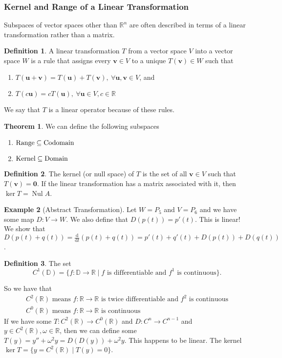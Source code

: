 \documentclass{article}
\numberwithin{equation}{section}
\theoremstyle{definition}
\newtheorem{thm}{Theorem}[subsection]
\newtheorem{defn}{Definition}[subsection]
\newtheorem{ex}[thm]{Example}
\newcommand{\V}{\mathbf{v}}
\newcommand{\U}{\mathbf{u}}
\newcommand{\den}[1][]{\text{d}#1}
\newcommand{\R}{\mathbb{R}}
\DeclareMathOperator{\nul}{Nul}
\let\oldforall\forall
\renewcommand{\forall}{\mathrel{\oldforall}}
\theoremstyle{adefn}
\begin{document}
	\subsubsection{Kernel and Range of a Linear Transformation}
	Subspaces of vector spaces other than $\R^n$ are often described in terms of a linear transformation rather than a matrix. 
	\begin{defn}
		A linear transformation $T$ from a vector space $V$ into a vector space $W$ is a rule that assigns every $\V \in V$ to a unique $T(\V) \in W$ such that
		\begin{enumerate}
			\itemsep0em
			\item $T(\U + \V) = T(\U) + T(\V),\ \forall \U, \V \in V$, and
			\item $T(c\U) = cT(\U),\ \forall \U \in V, c \in \R$
		\end{enumerate}
		We say that $T$ is a linear operator because of these rules. 
	\end{defn}
	\begin{thm}
		We can define the following subspaces
		\begin{enumerate}
			\item $\hbox{Range} \subseteq \hbox{Codomain}$
			\item $\hbox{Kernel} \subseteq \hbox{Domain}$
		\end{enumerate}
	\end{thm}
	\begin{defn}
		The kernel (or null space) of $T$ is the set of all $\V \in V$ such that $T(\V) = \textbf{0}$. If the linear transformation has a matrix associated with it, then $\ker T = \nul A$. 
	\end{defn}
	\begin{ex}[Abstract Transformation]
		Let $W = P_5$ and $V = P_6$ and we have some map $D: V \to W$. We also define that $D(p(t)) = p'(t)$. This is linear! We show that $D(p(t) + q(t)) = \frac{\den}{\den t}(p(t) + q(t)) = p'(t) + q'(t) + D(p(t)) + D(q(t))$.
	\end{ex}
	\begin{defn}
		The set 
		$$C^1(\mathbb{D}) = \{ f: \mathbb{D} \to \mathbb{R} \mid \text{$f$ is differentiable and $f^1$ is continuous} \}.$$
	\end{defn}
	So we have that 
	\begin{align*}
		C^2(\R) \text{ means $f: \R \to \R$ is twice differentiable and $f^2$ is continuous}\\
		C^0(\R) \text{ means $f: \R \to \R$ is continuous}
	\end{align*}
	If we have some $T: C^2(\R) \to C^0(\R)$ and $D: C^n \to C^{n-1}$ and $y \in C^2(\R), \omega \in \R$, then we can define some $T(y) = y'' + \omega^2y = D(D(y)) + \omega^2y$. This happens to be linear. The kernel $\ker T = \{ y = C^2(\R) \mid T(y) = 0 \}$. 
	
\end{document}
